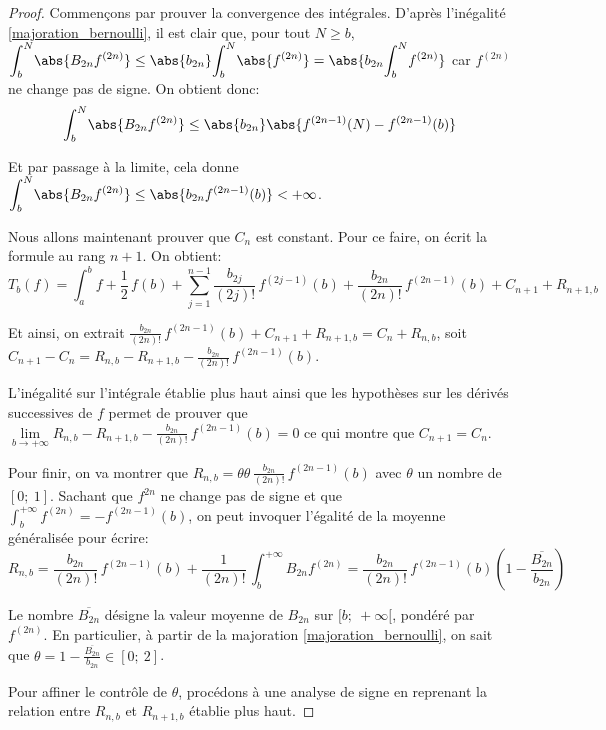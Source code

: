 \begin{proof}
Commençons par prouver la convergence des intégrales. D'après l'inégalité \ref{majoration_bernoulli}, il est clair que, pour tout $N \geq b$, $\displaystyle{\int_b^N} \abs{B_{2n} f^{(2n)}} \leq \abs{b_{2n}} \displaystyle{\int_b^N} \abs{f^{(2n)}} = \abs{b_{2n} \displaystyle{\int_b^N} f^{(2n)}}$ car $f^{(2n)}$ ne change pas de signe. On obtient donc:
\[
\displaystyle{\int_b^N} \abs{B_{2n} f^{(2n)}} \leq \abs{b_{2n}} \abs{f^{(2n-1)}(N) - f^{(2n-1)}(b)}
\]

Et par passage à la limite, cela donne $\displaystyle{\int_b^N} \abs{B_{2n} f^{(2n)}} \leq \abs{b_{2n} f^{(2n-1)}(b)} < +\infty$.

\medskip
Nous allons maintenant prouver que $C_n$ est constant. Pour ce faire, on écrit la formule au rang $n+1$. On obtient:
\[
T_b(f) = \displaystyle{\int_a^{b}} f + \frac{1}{2} \, f(b) + \displaystyle{\sum_{j=1}^{n-1}} \frac{b_{2j}}{(2j)!} \, f^{(2j-1)}(b) + \frac{b_{2n}}{(2n)!} \, f^{(2n-1)}(b) + C_{n+1} + R_{n+1,b}
\]

Et ainsi, on extrait $\frac{b_{2n}}{(2n)!} \, f^{(2n-1)}(b) + C_{n+1} + R_{n+1,b} = C_n + R_{n,b}$, soit $C_{n+1} - C_n = R_{n,b} - R_{n+1,b} - \frac{b_{2n}}{(2n)!} \, f^{(2n-1)}(b)$.

L'inégalité sur l'intégrale établie plus haut ainsi que les hypothèses sur les dérivés successives de $f$ permet de prouver que $\lim \limits_{b \to +\infty} R_{n,b} - R_{n+1,b} - \frac{b_{2n}}{(2n)!} \, f^{(2n-1)}(b) = 0$ ce qui montre que $C_{n+1} = C_n$.

\medskip
Pour finir, on va montrer que $R_{n,b} = \theta  \theta \, \frac{b_{2n}}{(2n)!} \, f^{(2n-1)}(b)$ avec $\theta$ un nombre de $[0;~1]$. Sachant que $f^{2n}$ ne change pas de signe et que $\displaystyle{\int_b^{+\infty}} f^{(2n)} = - f^{(2n-1)}(b)$, on peut invoquer l'égalité de la moyenne généralisée pour écrire:
\[
R_{n,b} = \frac{b_{2n}}{(2n)!} \, f^{(2n-1)}(b) + \frac{1}{(2n)!} \, \displaystyle{\int_b^{+\infty}} B_{2n} f^{(2n)} = \frac{b_{2n}}{(2n)!} \, f^{(2n-1)}(b) \left ( 1 - \frac{\overline{B_{2n}}}{b_{2n}}\right )
\]

Le nombre $\overline{B_{2n}}$ désigne la valeur moyenne de $B_{2n}$ sur $[b;~+\infty[$, pondéré par $f^{(2n)}$. En particulier, à partir de la majoration \ref{majoration_bernoulli}, on sait que $\theta = 1 - \frac{\overline{B_{2n}}}{b_{2n}} \in [0;~2]$. 

\medskip
Pour affiner le contrôle de $\theta$, procédons à une analyse de signe en reprenant la relation entre $R_{n,b}$ et $R_{n+1,b}$ établie plus haut.


\end{proof}
